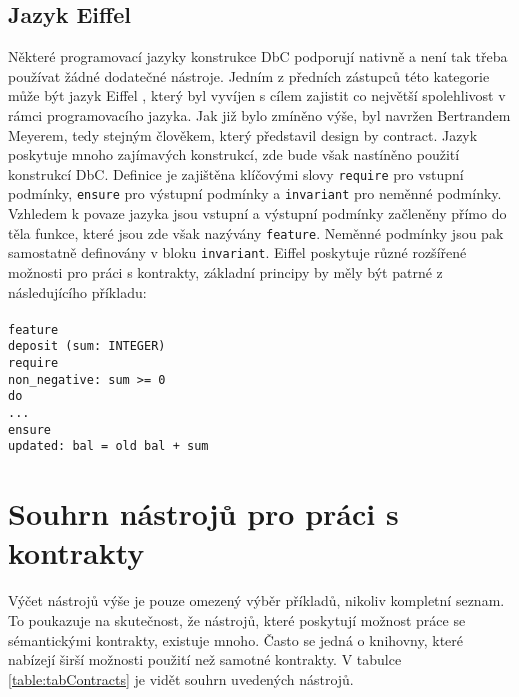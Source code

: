 		\subsection{Jazyk Eiffel}
			Některé programovací jazyky konstrukce DbC podporují nativně a není tak třeba používat žádné dodatečné nástroje. Jedním z předních zástupců této kategorie může být jazyk Eiffel \cite{eiffel}, který byl vyvíjen s cílem zajistit co největší spolehlivost v rámci programovacího jazyka. Jak již bylo zmíněno výše, byl navržen Bertrandem Meyerem, tedy stejným člověkem, který představil design by contract. Jazyk poskytuje mnoho zajímavých konstrukcí, zde bude však nastíněno použití konstrukcí DbC. Definice je zajištěna klíčovými slovy \texttt{require} pro vstupní podmínky, \texttt{ensure} pro výstupní podmínky a \texttt{invariant} pro neměnné podmínky. Vzhledem k povaze jazyka jsou vstupní a výstupní podmínky začleněny přímo do těla funkce, které jsou zde však nazývány \texttt{feature}. Neměnné podmínky jsou pak samostatně definovány v bloku \texttt{invariant}. Eiffel poskytuje různé rozšířené možnosti pro práci s kontrakty, základní principy by měly být patrné z následujícího příkladu:\\\\ 
			\- \- \- \- \- \texttt{feature}\\
			\- \- \- \- \- \- \- \- \- \- \texttt{deposit (sum: INTEGER)}\\
			\- \- \- \- \- \- \- \- \- \- \- \- \- \- \- \texttt{require}\\
			\- \- \- \- \- \- \- \- \- \- \- \- \- \- \- \- \- \- \- \- \texttt{non\_negative: sum \textgreater = 0}\\
			\- \- \- \- \- \- \- \- \- \- \- \- \- \- \- \texttt{do}\\
			\- \- \- \- \- \- \- \- \- \- \- \- \- \- \- \- \- \- \- \- \texttt{...}\\
			\- \- \- \- \- \- \- \- \- \- \- \- \- \- \- \texttt{ensure}\\
			\- \- \- \- \- \- \- \- \- \- \- \- \- \- \- \- \- \- \- \- \texttt{updated: bal = old bal + sum}

	\section{Souhrn nástrojů pro práci s kontrakty}
		Výčet nástrojů výše je pouze omezený výběr příkladů, nikoliv kompletní seznam. To poukazuje na skutečnost, že nástrojů, které poskytují možnost práce se sémantickými kontrakty, existuje mnoho. Často se jedná o knihovny, které nabízejí širší možnosti použití než samotné kontrakty. V tabulce \ref{table:tabContracts} je vidět souhrn uvedených nástrojů. 		
		
